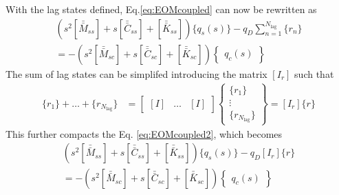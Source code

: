With the lag states defined, Eq.\ref{eq:EOMcoupled} can now be rewritten as
\begin{multline}
	\label{eq:EOMcoupled2}
	\left( s^2 \left[\bar{\bar{M}}_{ss}\right] + s \left[\bar{\bar{C}}_{ss}\right] + \left[\bar{\bar{K}}_{ss}\right] \right) \{ q_s(s)\}
	- q_D \sum_{n=1}^{N_\text{lag}} \{r_n\}
	\\
	= - \left( s^2 \left[\bar{\bar{M}}_{sc}\right] + s \left[\bar{\bar{C}}_{sc}\right] + \left[\bar{\bar{K}}_{sc}\right] \right) \begin{Bmatrix} q_c(s) \end{Bmatrix}
\end{multline}
The sum of lag states can be simplifed introducing the matrix $[I_r]$ such that
\begin{align}
	\{r_1\} + \dots + \{r_{N_\text{lag}}\}
	&= \begin{bmatrix} [I] & \dots & [I] \end{bmatrix} \begin{Bmatrix} \{r_1\} \\ \vdots \\ \{r_{N_\text{lag}}\} \end{Bmatrix} = [I_r] \{r\}
\end{align}
This further compacts the Eq. \ref{eq:EOMcoupled2}, which becomes
\begin{multline}
	\label{eq:EOMcoupled3}
	\left( s^2 \left[\bar{\bar{M}}_{ss}\right] + s \left[\bar{\bar{C}}_{ss}\right] + \left[\bar{\bar{K}}_{ss}\right] \right) \{ q_s(s)\}
	- q_D [I_r] \{r\}
	\\
	= - \left( s^2 \left[\bar{\bar{M}}_{sc}\right] + s \left[\bar{\bar{C}}_{sc}\right] + \left[\bar{\bar{K}}_{sc}\right] \right) \begin{Bmatrix} q_c(s) \end{Bmatrix}
\end{multline}

